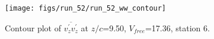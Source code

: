 \begin{figure}[H]
\centering
\texttt{[image: figs/run\_52/run\_52\_ww\_contour]}
\caption{Contour plot of $\overline{v_{z}^{\prime} v_{z}^{\prime}}$ at $z/c$=9.50, $V_{free}$=17.36, station 6.}
\label{fig:run_52_ww_contour}
\end{figure}


